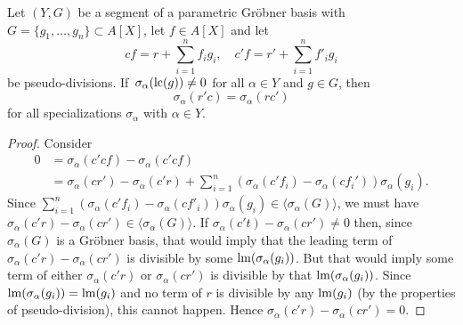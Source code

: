 \begin{lemma}\label{lem:ps_rem_unique}
  Let $(Y, G)$ be a segment of a parametric Gröbner basis with $G = \{g_{1}, \dots, g_{n}\} \subset A[X]$, let $f \in A[X]$ and let
  \[cf = r + \sum_{i=1}^{n} f_{i} g_{i}, \quad c'f = r' + \sum_{i=1}^{n} f'_{i} g_{i}\]
  be pseudo-divisions. If $\,\sigma_{\alpha}(\operatorname{lc}(g)) \neq 0$ for all $\alpha \in Y$ and $g \in G$, then
  \[\sigma_{\alpha}(r'c) = \sigma_{\alpha}(rc')\]
  for all specializations $\sigma_{\alpha}$ with $\alpha \in Y$.
\end{lemma}
\begin{proof}
  Consider
  \begin{align*}
    0 &= \sigma_{\alpha}(c' c f) - \sigma_{\alpha}(c' c f) \\
      &= \sigma_{\alpha}(cr') - \sigma_{\alpha}(c'r) + \sum_{i=1}^{n}\left(\sigma_{\alpha}(c' f_{i}) - \sigma_{\alpha}(c f_{i}')\right)\sigma_{\alpha}(g_{i}).
  \end{align*}
  Since $\sum_{i=1}^{n}(\sigma_{\alpha}(c' f_{i}) - \sigma_{\alpha}(c f'_{i}))\sigma_{\alpha}(g_{i}) \in \langle \sigma_{\alpha}(G) \rangle$, we must have $\sigma_{\alpha}(c' r) - \sigma_{\alpha}(c r') \in \langle \sigma_{\alpha}(G) \rangle$. If $\sigma_{\alpha}(c't) - \sigma_{\alpha}(cr') \neq 0$ then, since $\sigma_{\alpha}(G)$ is a Gröbner basis, that would imply that the leading term of $\sigma_{\alpha}(c' r) - \sigma_{\alpha}(c r')$ is divisible by some $\operatorname{lm}(\sigma_{\alpha}(g_{i}))$. But that would imply some term of either $\sigma_{\alpha}(c' r)$ or $\sigma_{\alpha}(c r')$ is divisible by that $\operatorname{lm}(\sigma_{\alpha}(g_{i}))$. Since $\operatorname{lm}(\sigma_{\alpha}(g_{i})) = \operatorname{lm}(g_{i})$ and no term of $r$ is divisible by any $\operatorname{lm}(g_{i})$ (by the properties of pseudo-division), this cannot happen. Hence $\sigma_{\alpha}(c' r) - \sigma_{\alpha}(c r') = 0$.
\end{proof}

